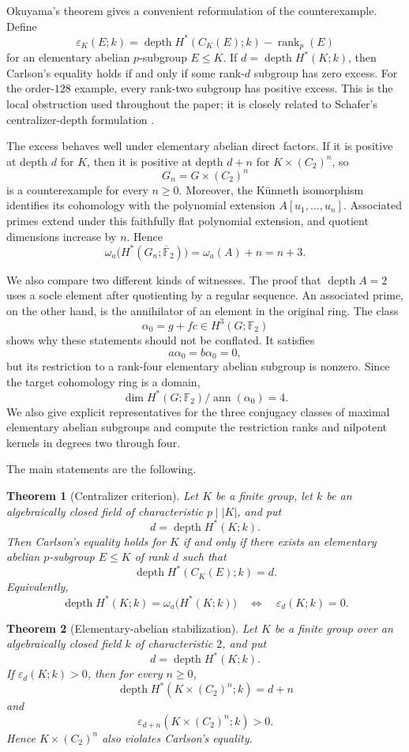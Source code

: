 \documentclass[11pt]{amsart}
\newtheorem{theorem}{Theorem}[section]
\theoremstyle{definition}
\theoremstyle{remark}
\DeclareMathOperator{\depth}{depth}
\DeclareMathOperator{\ann}{ann}
\DeclareMathOperator{\rank}{rank}
\newcommand{\F}{\mathbb F}
\newcommand{\kbar}{\overline{\mathbb F}_{2}}
\begin{document}
Okuyama's theorem gives a convenient reformulation of the counterexample.  Define
\[
\varepsilon_K(E;k)=\depth H^*(C_K(E);k)-\rank_p(E)
\]
for an elementary abelian $p$-subgroup $E\leq K$.  If $d=\depth H^*(K;k)$, then Carlson's equality holds if and only if some rank-$d$ subgroup has zero excess.  For the order-$128$ example, every rank-two subgroup has positive excess.  This is the local obstruction used throughout the paper; it is closely related to Schafer's centralizer-depth formulation \cite{Schafer2025}.

The excess behaves well under elementary abelian direct factors.  If it is positive at depth $d$ for $K$, then it is positive at depth $d+n$ for $K\times(C_2)^n$, so
\[
G_n=G\times(C_2)^n
\]
is a counterexample for every $n\geq0$.  Moreover, the K\"unneth isomorphism identifies its cohomology with the polynomial extension $A[u_1,\dots,u_n]$.  Associated primes extend under this faithfully flat polynomial extension, and quotient dimensions increase by $n$.  Hence
\[
\omega_a\bigl(H^*(G_n;\kbar)\bigr)=\omega_a(A)+n=n+3.
\]

We also compare two different kinds of witnesses.  The proof that $\depth A=2$ uses a socle element after quotienting by a regular sequence.  An associated prime, on the other hand, is the annihilator of an element in the original ring.  The class
\[
\alpha_0=g+fc\in H^3(G;\F_2)
\]
shows why these statements should not be conflated.  It satisfies
\[
a\alpha_0=b\alpha_0=0,
\]
but its restriction to a rank-four elementary abelian subgroup is nonzero.  Since the target cohomology ring is a domain,
\[
\dim H^*(G;\F_2)/\ann(\alpha_0)=4.
\]
We also give explicit representatives for the three conjugacy classes of maximal elementary abelian subgroups and compute the restriction ranks and nilpotent kernels in degrees two through four.

The main statements are the following.

\begin{theorem}[Centralizer criterion]
\label{thm:intro-criterion}
Let $K$ be a finite group, let $k$ be an algebraically closed field of characteristic $p\mid |K|$, and put
\[
d=\depth H^*(K;k).
\]
Then Carlson's equality holds for $K$ if and only if there exists an elementary abelian $p$-subgroup $E\leq K$ of rank $d$ such that
\[
\depth H^*(C_K(E);k)=d.
\]
Equivalently,
\[
\depth H^*(K;k)=\omega_a\bigl(H^*(K;k)\bigr)
\quad\Longleftrightarrow\quad
\varepsilon_d(K;k)=0.
\]
\end{theorem}

\begin{theorem}[Elementary-abelian stabilization]
\label{thm:intro-stabilization}
Let $K$ be a finite group over an algebraically closed field $k$ of characteristic $2$, and put
\[
d=\depth H^*(K;k).
\]
If $\varepsilon_d(K;k)>0$, then for every $n\geq0$,
\[
\depth H^*(K\times(C_2)^n;k)=d+n
\]
and
\[
\varepsilon_{d+n}(K\times(C_2)^n;k)>0.
\]
Hence $K\times(C_2)^n$ also violates Carlson's equality.
\end{theorem}
\end{document}
